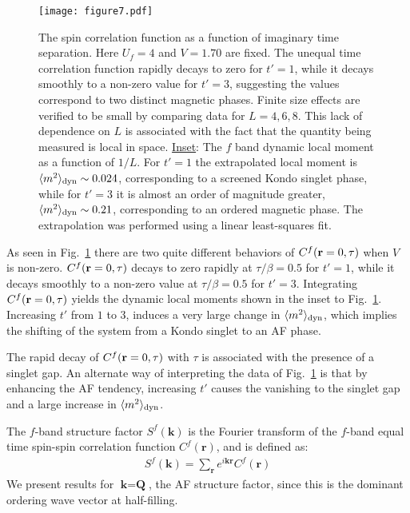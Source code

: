 \documentclass[pra,letterpaper,10pt,twocolumn]{revtex4}
\begin{document}
\begin{figure}[!h]
\texttt{[image: figure7.pdf]} 
\caption{
The spin correlation function as a function of 
imaginary time separation. Here $U_f=4$ and $V=1.70$ are fixed. 
The unequal
time correlation function rapidly decays to zero for $t'=1$, while it
decays smoothly to a non-zero value for $t'=3$, suggesting the
values correspond to two distinct
magnetic phases.  Finite size effects are verified to be
small by comparing data for $L=4,6,8$.  This
lack of dependence on $L$ is associated with the 
fact that the quantity being measured is local in space.
\underline{Inset}: The $f$ band dynamic
local moment as a function of $1/L$. For $t'=1$ the extrapolated local
moment is $\langle m^2 \rangle_{\rm dyn} \sim 0.024$, corresponding to a screened Kondo singlet phase,
while for $t'=3$ it is almost an order of magnitude greater,
$\langle m^2 \rangle_{\rm dyn} \sim 0.21$, corresponding to an ordered magnetic
phase. The extrapolation was performed using a linear least-squares fit.
\label{fig:dy_moment}
}
\end{figure}

As seen in Fig.~\ref{fig:dy_moment} there are two quite
different behaviors of $C^f({\bf r}=0,\tau)$ when $V$ is non-zero.
$C^f({\bf r}=0,\tau)$ decays to zero rapidly at $\tau/\beta = 0.5$ for
$t'=1$, while it decays smoothly to a non-zero value at $\tau/\beta =
0.5$ for $t'=3$. Integrating $C^f({\bf r}=0,\tau)$ yields the dynamic
local moments shown in the inset to Fig.~\ref{fig:dy_moment}. Increasing
$t'$ from $1$ to $3$, induces a very large change in $\langle m^2
\rangle_{\rm dyn}$, which implies the shifting of the system from a
Kondo singlet to an AF phase.

The rapid decay of 
$C^f({\bf r}=0,\tau)$ with $\tau$ is associated with the
presence of a singlet gap.  An alternate way of interpreting the data
of Fig.~\ref{fig:dy_moment} is that by enhancing the AF tendency,
increasing $t'$ causes the vanishing to the singlet gap and 
a large increase in $\langle m^2 \rangle_{\rm dyn}$.

The $f$-band structure factor $S^f(\textbf{k})$ is the Fourier transform
of the $f$-band equal time spin-spin correlation function
$C^f(\textbf{r})$, and is defined as:
\begin{align}
  S^f(\textbf{k})=\sum_{\textbf{r}}e^{i\textbf{k}\textbf{r}}C^f(\textbf{r})
\label{eq:structure}
\end{align}
We present results for $\textbf{k}=\textbf{Q}$, the AF structure factor,
since this is the dominant ordering wave vector at half-filling.
\end{document}
